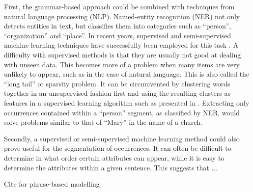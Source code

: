 First, the grammar-based approach could be combined with techniques from natural language processing (NLP).
Named-entity recognition (NER) not only detects entities in text, but classifies them into categories such as ``person'', ``organization'' and ``place''.
In recent years, supervised and semi-supervised machine learning techniques have successfully been employed for this task \citep{Miller2004}.
A difficulty with supervised methods is that they are usually not good at dealing with unseen data.
This becomes more of a problem when many items are very unlikely to appear, such as in the case of natural language.
This is also called the ``long tail'' or sparsity problem.
It can be circumvented by clustering words together in an unsupervised fashion first and using the resulting clusters as features in a supervised learning algorithm such as presented in \citet{Miller2004}.
Extracting only occurrences contained within a ``person'' segment, as classified by NER, would solve problems similar to that of ``Mary'' in the name of a church.

Secondly, a supervised or semi-supervised machine learning method could also prove useful for the segmentation of occurrences.
It can often be difficult to determine in what order certain attributes can appear, while it is easy to determine the attributes within a given sentence.
This suggests that ...

Cite \citep{Lin2009} for phrase-based modelling